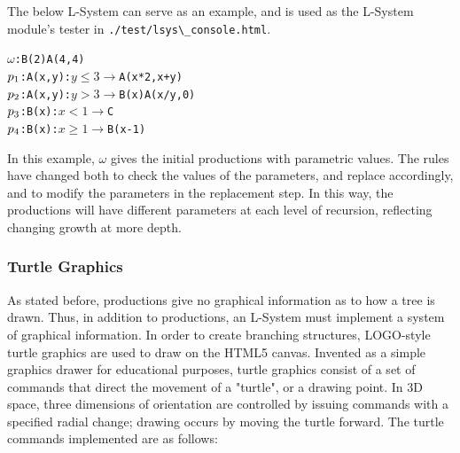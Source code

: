 \documentclass{article}
\newcommand{\tab}{\hspace*{2em}}
\begin{document}
    \tab The below L-System can serve as an example, and is used as the L-System module's tester in
\verb|./test/lsys\_console.html|.
    \begin{alltt}
    \(\omega\)  : B(2)A(4,4)
    \(p\sb{1}\) : A(x,y) : \(y \leq 3 \rightarrow\) A(x*2, x+y)
    \(p\sb{2}\) : A(x,y) : \(y > 3 \rightarrow\) B(x)A(x/y, 0)
    \(p\sb{3}\) : B(x)   : \(x < 1  \rightarrow\) C
    \(p\sb{4}\) : B(x)   : \(x \geq 1 \rightarrow\) B(x-1)   
    \end{alltt}
In this example, $\omega$ gives the initial productions with parametric values. The rules have
changed both to check the values of the parameters, and replace accordingly, and to modify the
parameters in the replacement step. In this way, the productions will have different parameters at
each level of recursion, reflecting changing growth at more depth.

            \subsubsection{Turtle Graphics}
    \tab As stated before, productions give no graphical information as to how a tree is drawn.
Thus, in addition to productions, an L-System must implement a system of graphical information. In
order to create branching structures, LOGO-style turtle graphics are used to draw on the HTML5
canvas. Invented as a simple graphics drawer for educational purposes, turtle graphics consist of a
set of commands that direct the movement of a "turtle", or a drawing point. In 3D space, three
dimensions of orientation are controlled by issuing commands with a specified radial change;
drawing occurs by moving the turtle forward. The turtle commands implemented are as follows:
\end{document}

